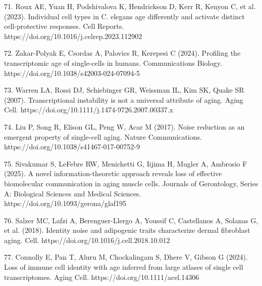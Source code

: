\documentclass[11pt]{article}
\begin{document}
71. Roux AE, Yuan H, Podshivalova K, Hendrickson D, Kerr R, Kenyon C, et al. (2023). Individual cell types in C. elegans age differently and activate distinct cell-protective responses. Cell Reports. https://doi.org/10.1016/j.celrep.2023.112902

72. Zakar-Polyak E, Csordas A, Palovics R, Kerepesi C (2024). Profiling the transcriptomic age of single-cells in humans. Communications Biology. https://doi.org/10.1038/s42003-024-07094-5

73. Warren LA, Rossi DJ, Schiebinger GR, Weissman IL, Kim SK, Quake SR (2007). Transcriptional instability is not a universal attribute of aging. Aging Cell. https://doi.org/10.1111/j.1474-9726.2007.00337.x

74. Liu P, Song R, Elison GL, Peng W, Acar M (2017). Noise reduction as an emergent property of single-cell aging. Nature Communications. https://doi.org/10.1038/s41467-017-00752-9

75. Sivakumar S, LeFebre RW, Menichetti G, Iijima H, Mugler A, Ambrosio F (2025). A novel information-theoretic approach reveals loss of effective biomolecular communication in aging muscle cells. Journals of Gerontology, Series A: Biological Sciences and Medical Sciences. https://doi.org/10.1093/gerona/glaf195

76. Salzer MC, Lafzi A, Berenguer-Llergo A, Youssif C, Castellanos A, Solanas G, et al. (2018). Identity noise and adipogenic traits characterize dermal fibroblast aging. Cell. https://doi.org/10.1016/j.cell.2018.10.012

77. Connolly E, Pan T, Aluru M, Chockalingam S, Dhere V, Gibson G (2024). Loss of immune cell identity with age inferred from large atlases of single cell transcriptomes. Aging Cell. https://doi.org/10.1111/acel.14306
\end{document}
